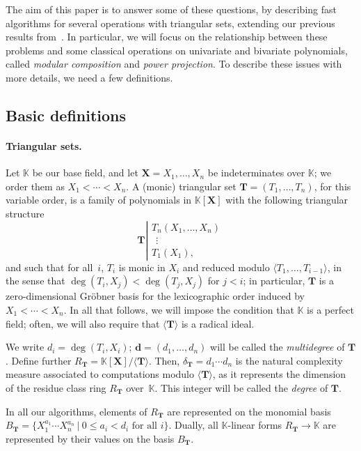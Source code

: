 \documentclass[12pt]{article}
\def\K {\ensuremath{\mathbb{K}}}
\def\bd {\ensuremath{\mathbf{d}}}
\def\Tt {\ensuremath{\mathbf{T}}}
\def\X {\ensuremath{\mathbf{X}}}
\begin{document}
The aim of this paper is to answer some of these questions, by
describing fast algorithms for several operations with triangular
sets, extending our previous results from~\cite{PoSc10}. In
particular, we will focus on the relationship between these problems
and some classical operations on univariate and bivariate polynomials,
called {\em modular composition} and {\em power projection}. To
describe these issues with more details, we need a few definitions.



\subsection{Basic definitions}\label{ssec:equiproj}

\paragraph{Triangular sets.} Let $\K$ be our base field, and let
$\X=X_1,\dots,X_n$ be indeterminates over $\K$; we order them as $X_1
< \cdots < X_n$.  A (monic) triangular set $\Tt=(T_1,\dots,T_n)$, for
this variable order, is a family of polynomials in $\K[\X]$ with the
following triangular structure
\[\Tt \left | \begin{array}{l}
    T_n(X_1,\dots,X_n)\\
    ~~\vdots\\
    T_1(X_1), 
  \end{array}\right .\]
and such that for all~$i$, $T_i$ is monic in $X_i$ and reduced modulo
$\langle T_1,\dots,T_{i-1}\rangle$, in the sense that $\deg(T_i,X_j) <
\deg(T_j,X_j)$ for $j<i$; in particular, $\Tt$ is a zero-dimensional
Gr\"obner basis for the lexicographic order induced by $X_1 < \cdots <
X_n$. In all that follows, we will impose the condition that $\K$ is a
perfect field; often, we will also require that $\langle \Tt\rangle$
is a radical ideal.

We write $d_i=\deg(T_i,X_i)$; $\bd=(d_1,\dots,d_n)$ will be called the
{\em multidegree} of $\Tt$. Define further $R_\Tt=\K[\X]/\langle
\Tt\rangle$. Then, $\delta_\Tt=d_1 \cdots d_n$ is the natural
complexity measure associated to computations modulo $\langle \Tt
\rangle$, as it represents the dimension of the residue class ring
$R_\Tt$ over~$\K$. This integer will be called the {\em degree} of
$\Tt$.

In all our algorithms, elements of $R_\Tt$ are represented on the
monomial basis $B_\Tt=\{X_1^{a_1}\cdots X_n^{a_n} \ | \ 0 \le a_i <
d_i \text{~for all $i$}\}$. Dually, all $\K$-linear forms $R_\Tt \to
\K$ are represented by their values on the basis $B_\Tt$.
\end{document}
